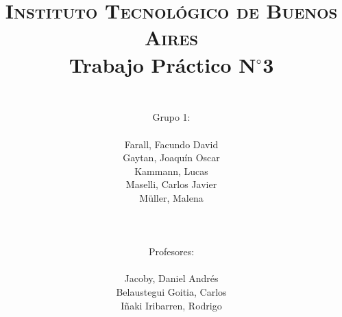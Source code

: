




	\title{
		\normalfont \normalsize \textsc{Instituto Tecnol\'ogico de Buenos Aires} \\ [25pt]
		\huge Trabajo Pr\'actico N$^{\circ}$3 \\
		\author{
			\\Grupo 1:\\\\Farall, Facundo David\\Gaytan, Joaqu\'in Oscar\\Kammann, Lucas\\Maselli, Carlos Javier\\M\"uller, Malena \\ \\ \\ \\
			Profesores: \\\\ Jacoby, Daniel Andrés\\Belaustegui Goitia, Carlos\\Iñaki Iribarren, Rodrigo \\ \\ \\ 
		} 		
	}
	\maketitle
	\newpage

	\tableofcontents

	\newpage
	
	\newpage
	
	\newpage
	
	\newpage
	
	\newpage
	
	\newpage
	



